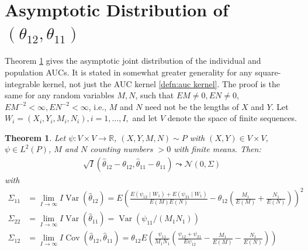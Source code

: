 \documentclass[12pt]{article}
\DeclareMathOperator{\AUC}{AUC}
\DeclareMathOperator{\V}{Var}
\DeclareMathOperator{\cov}{Cov}
\newcommand{\I}{I}
\newcommand{\E}{E}
\renewcommand{\P}{P}
\newcommand{\cind}{\perp \!\!\! \perp}
\newcommand{\aucindiv}{\theta_{11}}%
\newcommand{\aucpop}{\theta_{12}}%
\newcommand{\aucindivhat}{\hat{\theta}_{11}}%
\newcommand{\aucpophat}{\hat{\theta}_{12}}%
\newcommand{\Kernel}{\psi}
\newcommand{\W}[1]{W_{#1}}
\newcommand{\seqspace}{V}%
\newtheorem{theorem}{Theorem}
\begin{document}
\section{Asymptotic Distribution of $(\aucpop,\aucindiv)$}\label{section:asymptotics}

Theorem \ref{theorem:asymptotic} gives the asymptotic joint
distribution of the individual and population AUCs. It is stated in
somewhat greater generality for any square-integrable kernel, not just
the AUC kernel \eqref{defn:auc kernel}. The proof is the same for any
random variables $M,N$, such that $\E M\neq 0, \E N\neq 0$,
$\E M^{-2}<\infty,\E N^{-2}<\infty$, i.e., $M$ and $N$ need not be the
lengths of $X$ and $Y$.  Let $\W{i}=(X_i,Y_i,M_i,N_i),i=1,\ldots,\I,$ and let $\seqspace$ denote the space of finite sequences.
\begin{theorem}\label{theorem:asymptotic} Let $\psi:V\times V\to\mathbb{R}$, $(X,Y,M,N)\sim\P$ with $(X,Y)\in V\times V$, $\psi\in L^2(\P)$, $M$ and $N$ counting numbers $> 0$ with finite means. Then:
  \begin{align}
    \sqrt{\I}(\aucpophat-\aucpop,\aucindivhat-\aucindiv) \leadsto \mathcal{N}(0,\Sigma)
  \end{align}
  with
  \begin{align}
    \Sigma_{11} &= \lim_{\I\to\infty} \I\V(\aucpophat) =
    \E\left(\frac{\E(\Kernel_{12}\mid\W{1})+\E(\Kernel_{21}\mid\W{1})}{\E (M)\E (N)} - \aucpop\left(\frac{M_1}{\E (M)} + \frac{N_1}{\E (N)}\right)   \right)^2
    \\
    \Sigma_{22} &= \lim_{\I\to\infty} \I\V(\aucindivhat) =
    \V(\Kernel_{11}/(M_1N_1))
    \\
    \Sigma_{12} &= \lim_{\I\to\infty} \I\cov(\aucpophat,\aucindivhat) =
    \aucpop\E\left(\frac{\Kernel_{11}}{M_1N_1}\left(\frac{\Kernel_{12}+\Kernel_{21}}{\E\Kernel_{12}} - \frac{M_1}{\E (M)}-\frac{N_1}{\E (N)}  \right) \right)
  \end{align}
\end{theorem}
\end{document}
